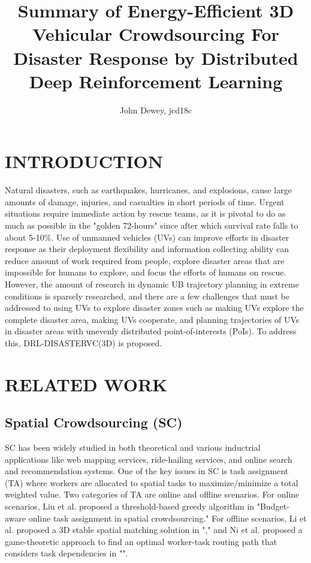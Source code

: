 \documentclass[sigconf, natbib=false]{acmart}
\begin{document}
   \title{Summary of Energy-Efficient 3D Vehicular Crowdsourcing For Disaster Response by Distributed Deep Reinforcement Learning}
   \author{John Dewey, jcd18c}
   \maketitle

   \section{INTRODUCTION}
   Natural disasters, such as earthquakes, hurricanes, and explosions, cause large amounts of damage, injuries, and casualties in short periods of time. Urgent situations require immediate action by rescue teams, as it is pivotal to do as much as possible in the "golden 72-hours" since after which survival rate falls to about 5-10\%. Use of unmanned vehicles (UVs) can improve efforts in disaster response as their deployment flexibility and information collecting ability can reduce amount of work required from people, explore disaster areas that are impossible for humans to explore, and focus the efforts of humans on rescue. However, the amount of research in dynamic UB trajectory planning in extreme conditions is sparsely researched, and there are a few challenges that must be addressed to using UVs to explore disaster zones such as making UVs explore the complete disaster area, making UVs cooperate, and planning trajectories of UVs in disaster areas with unevenly distributed point-of-interests (PoIs). To address this, DRL-DISASTERVC(3D) is proposed.

   \section{RELATED WORK}
   \subsection{Spatial Crowdsourcing (SC)}
   SC has been widely studied in both theoretical and various inductrial applications like web mapping services, ride-hailing services, and online search and recommendation systems. One of the key issues in SC is task assignment (TA) where workers are allocated to spatial tasks to maximize/minimize a total weighted value. Two categories of TA are online and offline scenarios. For online scenarios, Liu et al. proposed a threshold-based greedy algorithm in "Budget-aware online task assignment in spatial crowdsourcing." For offline scenarios, Li et al. proposed a 3D stable spatial matching solution in "," and Ni et al. proposed a game-theoretic approach to find an optimal worker-task routing path that considers task dependencies in "".
\end{document}
